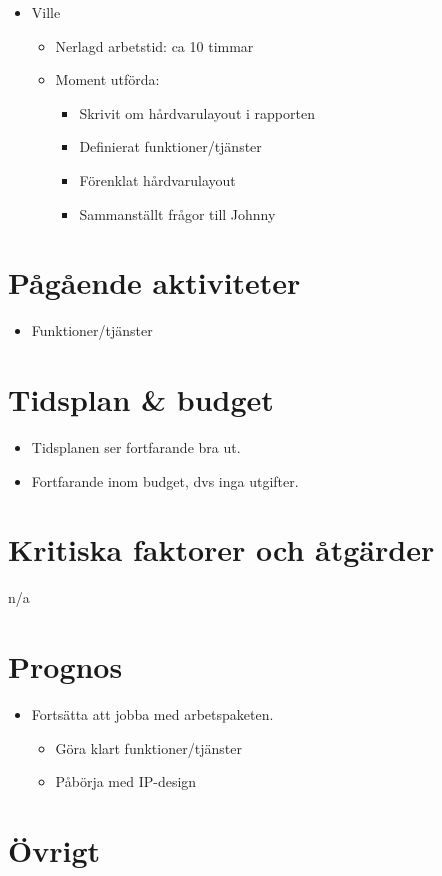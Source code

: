 \begin{itemize}[noitemsep]
    \item Ville
    \begin{itemize}[noitemsep]
        \item Nerlagd arbetstid: ca 10 timmar
        \item Moment utförda:
        \begin{itemize}[noitemsep]
            \item Skrivit om hårdvarulayout i rapporten
            \item Definierat funktioner/tjänster
            \item Förenklat hårdvarulayout 
            \item Sammanställt frågor till Johnny
        \end{itemize}
    \end{itemize}
\end{itemize}

\section{Pågående aktiviteter}
\begin{itemize}[noitemsep]
    \item Funktioner/tjänster
\end{itemize}

\section{Tidsplan \& budget}
\begin{itemize}[noitemsep]
    \item Tidsplanen ser fortfarande bra ut.
    \item Fortfarande inom budget, dvs inga utgifter.
\end{itemize}

\section{Kritiska faktorer och åtgärder}
n/a

\section{Prognos}	
\begin{itemize}[noitemsep]
    \item Fortsätta att jobba med arbetspaketen.
    \begin{itemize}
    	\item Göra klart funktioner/tjänster
    	\item Påbörja med IP-design
    \end{itemize}
\end{itemize}

\section{Övrigt}

